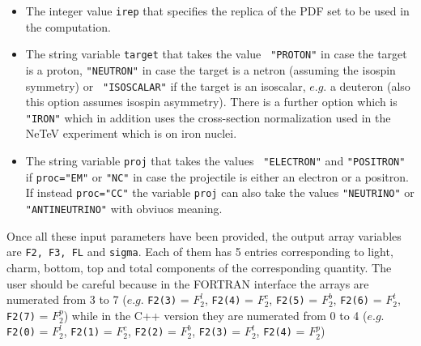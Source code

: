 \documentclass[10pt,a4paper]{article}
\begin{document}
\begin{itemize}
{    q}. For the setting of the PDF evolution, the user can refer to
  the APFEL manual.
\item The integer value {\tt irep} that specifies the replica of the PDF
  set to be used in the computation.
\item The string variable {\tt target} that takes the value {\tt
    "PROTON"} in case the target is a proton, {\tt "NEUTRON"} in case
  the target is a netron (assuming the isospin symmetry) or {\tt
    "ISOSCALAR"} if the target is an isoscalar, $e.g.$ a
  deuteron (also this option assumes isospin asymmetry). There is a
  further option which is {\tt "IRON"} which in addition uses the cross-section
  normalization used in the NeTeV experiment which is on iron nuclei.
\item The string variable {\tt proj} that takes the values {\tt
    "ELECTRON"} and {\tt "POSITRON"} if {\tt proc="EM"} or {\tt "NC"}
  in case the projectile is either an electron or a positron. If
  instead {\tt proc="CC"} the variable {\tt proj} can also take the
  values {\tt "NEUTRINO"} or {\tt "ANTINEUTRINO"} with obviuos meaning.
\end{itemize}

Once all these input parameters have been provided, the output
array variables are {\tt F2, F3, FL} and {\tt sigma}. Each of them has
5 entries corresponding to light, charm, bottom, top and total
components of the corresponding quantity.
The user should be careful because in the FORTRAN interface the arrays
are numerated from 3 to 7 ($e.g.$ {\tt F2(3)} = $F_2^l$, {\tt F2(4)} =
$F_2^c$, {\tt F2(5)} = $F_2^b$, {\tt F2(6)} = $F_2^t$, {\tt F2(7)} =
$F_2^p$) while in the C++ version they are numerated from 0 to 4 ($e.g.$ {\tt F2(0)} = $F_2^l$, {\tt F2(1)} =
$F_2^c$, {\tt F2(2)} = $F_2^b$, {\tt F2(3)} = $F_2^t$, {\tt F2(4)} =
$F_2^p$)
\end{document}
